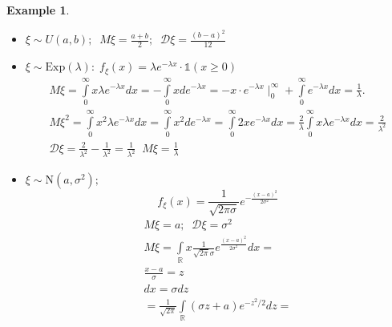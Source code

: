 \documentclass[12pt,letterpaper]{report}
\newtheorem*{example}{Example}
\begin{document}
\begin{example}
\begin{itemize}
\begin{gather*}
            \sum_{k=0}^{\infty} k^2 (1-p)^{k-1} = \frac{2}{p^{3}} - \frac{1}{p^2} \;\; \mid (1-p)\cdot p \\
                \sum_{k=0}^{\infty} k^2(1-p)^{k}\cdot p = \frac{2(1-p)}{p^2} - \frac{1-p}{p} \\
                \mathcal{D} = \frac{2(1-p)}{p^2} - \frac{1-p}{p} - \left(\frac{1-p}{p}\right)^2 =
                \frac{2(1-p)}{p^2} - \frac{1-p}{p}\left(1+\frac{1-p}{p}\right) = \\
                = \frac{2(1-p)}{p^2} - \frac{1-p}{p^2} = \frac{1-p}{p^2}; \\
                \mathcal{D}\xi = \frac{1-p}{p^2}; \;\; M\xi = \frac{1-p}{p}
            \end{gather*}
        \item[5.] $\xi \sim U(a,b); \;\; M\xi = \frac{a+b}{2}; \;\; \mathcal{D}\xi = \frac{(b-a)^2}{12}$
        \item[6.] $\xi \sim \text{Exp}(\lambda): \; f_{\xi} (x) = \lambda e^{-\lambda x} \cdot \mathds{1}(x\geq 0) $
            \begin{gather*}
                M\xi = \int\limits_{0}^{\infty} x \lambda e^{-\lambda x} dx = -\int\limits_{0}^{\infty} x de^{-\lambda x} = -x \cdot e^{-\lambda x} \mid_{0}^{\infty} + \int\limits_{0}^{\infty} e^{-\lambda x} dx = \frac{1}{\lambda}.\\
                M\xi^2 = \int\limits_{0}^{\infty} x^2 \lambda e^{-\lambda x} dx = \int\limits_{0}^{\infty}x^2 de^{-\lambda x} = \int\limits_{0}^{\infty}2x e^{-\lambda x}dx = \frac{2}{\lambda} \int\limits_{0}^{\infty}x \lambda e^{-\lambda x} dx = \frac{2}{\lambda^2} \\
                \mathcal{D}\xi = \frac{2}{\lambda^2} - \frac{1}{\lambda^2} = \frac{1}{\lambda^2} 
                \;\; M\xi = \frac{1}{\lambda}
            \end{gather*}
        \item[7.] $\xi \sim \text{N}(a, \sigma^2); $
            \[ f_{\xi}(x) = \frac{1}{\sqrt{2\pi \sigma}}e^{-\frac{(x-a)^2}{2\sigma^2}} \]
            \begin{gather*}
                M\xi = a; \;\; \mathcal{D}\xi = \sigma^2 \\
                M\xi = \int\limits_{\mathbb{R}}^{}x \frac{1}{\sqrt{2\pi}\sigma} e^{\frac{(x-a)^2}{2\sigma^2}}dx  = \\
                \frac{x-a}{\sigma} = z\\
                dx = \sigma dz \\
            =  \frac{1}{\sqrt{2\pi}} \int\limits_{\mathbb{R}}^{} (\sigma z + a) e^{-z^2/2} dz =

\end{gather*}
\end{itemize}
\end{example}
\end{document}
